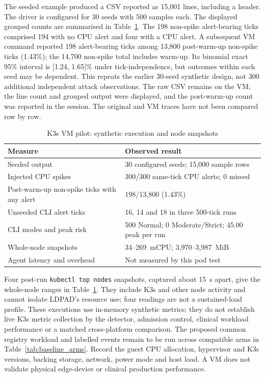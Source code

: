 \documentclass{ieeeaccess}
\begin{document}
The seeded example produced a CSV reported as 15,001 lines, including a header. The driver is configured for 30 seeds with 500 samples each. The displayed grouped counts are summarised in Table~\ref{tab:k3s_pilot}. The 198 non-spike alert-bearing ticks comprised 194 with no CPU alert and four with a CPU alert. A subsequent VM command reported 198 alert-bearing ticks among 13,800 post-warm-up non-spike ticks (1.43\%); the 14,700 non-spike total includes warm-up. Its binomial exact 95\% interval is [1.24, 1.65]\% under tick-independence, but outcomes within each seed may be dependent. This repeats the earlier 30-seed synthetic design, not 300 additional independent attack observations. The raw CSV remains on the VM; the line count and grouped output were displayed, and the post-warm-up count was reported in the session. The original and VM traces have not been compared row by row.

\begin{table}[ht]
\caption{K3s VM pilot: synthetic execution and node snapshots}
\label{tab:k3s_pilot}
\centering\footnotesize
\setlength{\tabcolsep}{3pt}
\begin{tabular}{@{}p{}p{}@{}}
\toprule
Measure & Observed result \\
\midrule
Seeded output & 30 configured seeds; 15,000 sample rows \\
Injected CPU spikes & 300/300 same-tick CPU alerts; 0 missed \\
Post-warm-up non-spike ticks with any alert & 198/13,800 (1.43\%) \\
Unseeded CLI alert ticks & 16, 14 and 18 in three 500-tick runs \\
CLI modes and peak risk & 500 Normal; 0 Moderate/Strict; 45.00 peak per run \\
Whole-node snapshots & 34--269~mCPU; 3,970--3,987~MiB \\
Agent latency and overhead & Not measured by this pod test \\
\bottomrule
\end{tabular}
\end{table}

Four post-run \texttt{kubectl top nodes} snapshots, captured about 15~s apart, give the whole-node ranges in Table~\ref{tab:k3s_pilot}. They include K3s and other node activity and cannot isolate LDPAD's resource use; four readings are not a sustained-load profile. These executions use in-memory synthetic metrics; they do not establish live K3s metric collection by the detector, admission control, clinical workload performance or a matched cross-platform comparison. The proposed common registry workload and labelled events remain to be run across compatible arms in Table~\ref{tab:baseline_arms}. Record the guest CPU allocation, hypervisor and K3s versions, backing storage, network, power mode and host load. A VM does not validate physical edge-device or clinical production performance.
\end{document}

